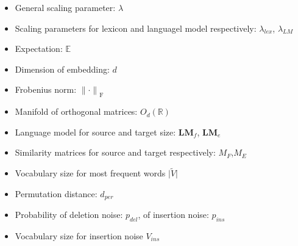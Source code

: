 \begin{itemize}
	\item General scaling parameter: $\lambda$
	\item Scaling parameters for lexicon and languagel model respectively: $\lambda_{lex}$, $\lambda_{LM}$
	\item Expectation: $\mathbb{E}$
	\item Dimension of embedding: $d$
	\item Frobenius norm: ${\lVert \cdot \rVert}_{\text{F}}$
	\item  Manifold of orthogonal matrices: $ O_d(\mathbb{R})$
	\item Language model for source and target size: $\textbf{LM}_f$, $\textbf{LM}_e$
	\item Similarity matrices for source and target respectively: $M_F$,$M_E$
	\item Vocabulary size for most frequent words ${\lvert \tilde{V} \rvert}$
	\item Permutation distance: $d_{per}$
	\item Probability of deletion noise: $p_{del}$, of insertion noise: $p_{ins}$
	\item Vocabulary size for insertion noise  $V_{ins}$  
\end{itemize}










